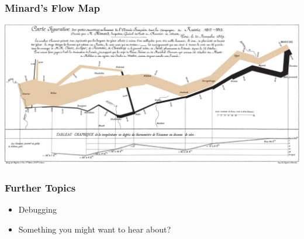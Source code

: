 \documentclass[paper=screen,mathserif]{beamer}\usepackage[]{graphicx}\usepackage[]{color}
\newcommand{\ft}[1]{\frametitle{#1}}
\begin{document}
\begin{frame}
  \ft{Minard's Flow Map}
  \centering
  \includegraphics[width=\linewidth]{graphics/1024px-Minard.png}
\end{frame}

\begin{frame}
  \ft{Further Topics}
  \begin{itemize}
  \item Debugging
  \item Something you might want to hear about?
  \end{itemize}
\end{frame}
\end{document}

